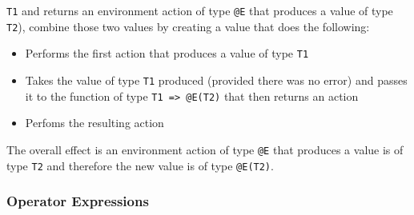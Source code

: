 \documentclass{article}
\begin{document}
\verb|T1| and returns an environment action of type \verb|@E| that produces
a value of type \verb|T2|), combine those two values by creating a value that
does the following:
\begin{itemize}
\item
Performs the first action that produces a value of type \verb|T1|

\item
Takes the value of type \verb|T1| produced (provided there was no error) and
passes it to the function of type \verb|T1 => @E(T2)| that then returns an
action

\item
Perfoms the resulting action
\end{itemize}
The overall effect is an environment action  of type \verb|@E| that produces
a value is of type \verb|T2| and therefore the new value is of type
\verb|@E(T2)|.

\newpage

\subsubsection{Operator Expressions}
\end{document}

